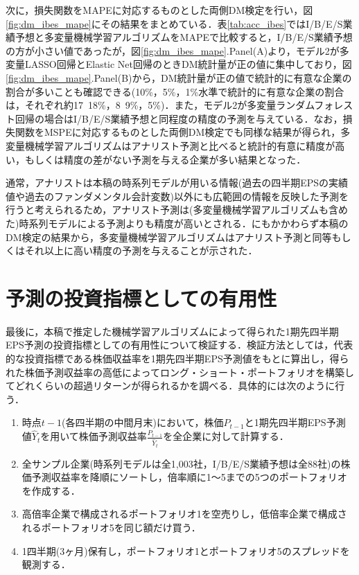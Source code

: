 \documentclass[a4paper，12pt]{jsarticle}
\begin{document}
次に，損失関数をMAPEに対応するものとした両側DM検定を行い，図\ref{fig:dm_ibes_mape}にその結果をまとめている．表\ref{tab:acc_ibes}ではI/B/E/S業績予想と多変量機械学習アルゴリズムをMAPEで比較すると，I/B/E/S業績予想の方が小さい値であったが，図\ref{fig:dm_ibes_mape}.Panel(A)より，モデル2が多変量LASSO回帰とElastic Net回帰のときDM統計量が正の値に集中しており，図\ref{fig:dm_ibes_mape}.Panel(B)から，DM統計量が正の値で統計的に有意な企業の割合が多いことも確認できる(10\%，5\%，1\%水準で統計的に有意な企業の割合は，それぞれ約17~18\%，8~9\%，5\%)．また，モデル2が多変量ランダムフォレスト回帰の場合はI/B/E/S業績予想と同程度の精度の予測を与えている．なお，損失関数をMSPEに対応するものとした両側DM検定でも同様な結果が得られ，多変量機械学習アルゴリズムはアナリスト予測と比べると統計的有意に精度が高い，もしくは精度の差がない予測を与える企業が多い結果となった．

通常，アナリストは本稿の時系列モデルが用いる情報(過去の四半期EPSの実績値や過去のファンダメンタル会計変数)以外にも広範囲の情報を反映した予測を行うと考えられるため\citep{sakurai1990}，アナリスト予測は(多変量機械学習アルゴリズムも含めた)時系列モデルによる予測よりも精度が高いとされる．にもかかわらず本稿のDM検定の結果から，多変量機械学習アルゴリズムはアナリスト予測と同等もしくはそれ以上に高い精度の予測を与えることが示された．

\part{予測の投資指標としての有用性} \label{par:portfolio}

最後に，本稿で推定した機械学習アルゴリズムによって得られた1期先四半期EPS予測の投資指標としての有用性について検証する．検証方法としては，代表的な投資指標である株価収益率を1期先四半期EPS予測値をもとに算出し，得られた株価予測収益率の高低によってロング・ショート・ポートフォリオを構築してどれくらいの超過リターンが得られるかを調べる．具体的には次のように行う．

\begin{enumerate}
  \item 時点$t-1$(各四半期の中間月末)において，株価$P_{t-1}$と1期先四半期EPS予測値$\hat{Y}_t$を用いて株価予測収益率$\frac{P_{t-1}}{\hat{Y}_t}$を全企業に対して計算する．
  \item 全サンプル企業(時系列モデルは全1,003社，I/B/E/S業績予想は全88社)の株価予測収益率を降順にソートし，倍率順に1～5までの5つのポートフォリオを作成する．
  \item 高倍率企業で構成されるポートフォリオ1を空売りし，低倍率企業で構成されるポートフォリオ5を同じ額だけ買う．
  \item 1四半期(3ヶ月)保有し，ポートフォリオ1とポートフォリオ5のスプレッドを観測する．
\end{enumerate}
\end{document}
